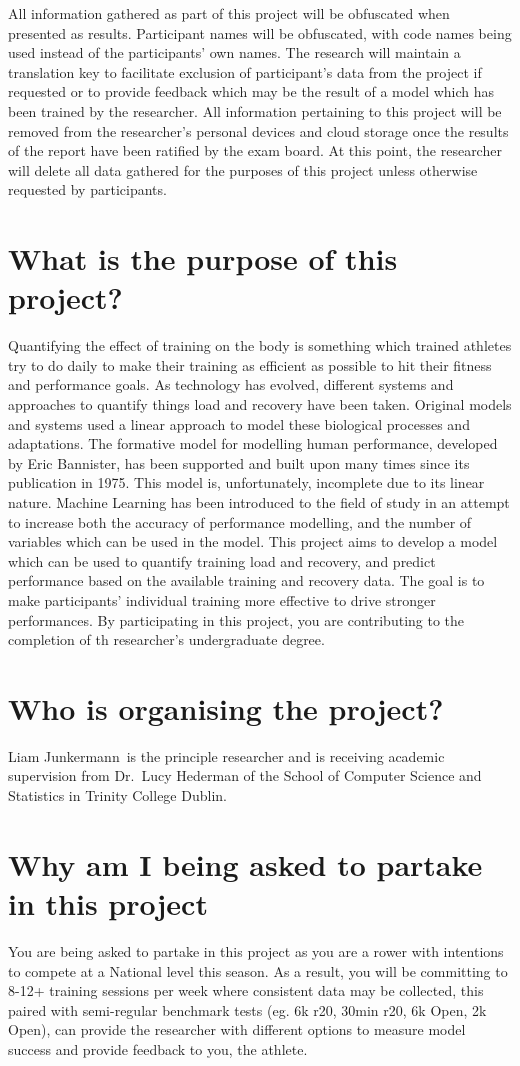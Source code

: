 \documentclass[a4paper,12pt]{article}
\newcommand{\authorname}{Liam Junkermann}
\begin{document}
All information gathered as part of this project will be obfuscated when presented as results. Participant names will be obfuscated, with code names being used instead of the participants' own names. The research will maintain a translation key to facilitate exclusion of participant's data from the project if requested or to provide feedback which may be the result of a model which has been trained by the researcher. All information pertaining to this project will be removed from the researcher's personal devices and cloud storage once the results of the report have been ratified by the exam board. At this point, the researcher will delete all data gathered for the purposes of this project unless otherwise requested by participants.

\section*{What is the purpose of this project?}
Quantifying the effect of training on the body is something which trained athletes try to do daily to make their training as efficient as possible to hit their fitness and performance goals. As technology has evolved, different systems and approaches to quantify things load and recovery have been taken. Original models and systems used a linear approach to model these biological processes and adaptations. The formative model for modelling human performance, developed by Eric Bannister, has been supported and built upon many times since its publication in 1975. This model is, unfortunately, incomplete due to its linear nature. Machine Learning has been introduced to the field of study in an attempt to increase both the accuracy of performance modelling, and the number of variables which can be used in the model. This project aims to develop a model which can be used to quantify training load and recovery, and predict performance based on the available training and recovery data. The goal is to make participants' individual training more effective to drive stronger performances.
By participating in this project, you are contributing to the completion of th researcher's undergraduate degree.
\section*{Who is organising the project?}
\authorname~is the principle researcher and is receiving academic supervision from Dr.~Lucy Hederman of the School of Computer Science and Statistics in Trinity College Dublin.
\section*{Why am I being asked to partake in this project}
You are being asked to partake in this project as you are a rower with intentions to compete at a National level this season. As a result, you will be committing to 8-12+ training sessions per week where consistent data may be collected, this paired with semi-regular benchmark tests (eg. 6k r20, 30min r20, 6k Open, 2k Open), can provide the researcher with different options to measure model success and provide feedback to you, the athlete.
\end{document}

